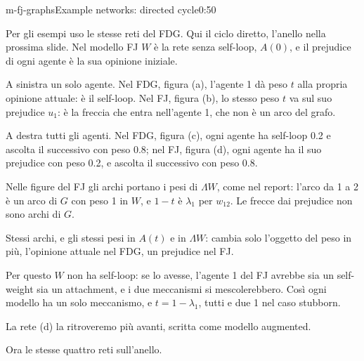 
\begin{slide}{m-fj-graphs}{Example networks: directed cycle}{0:50}
  \begin{discorso}
    \item Per gli esempi uso le stesse reti del FDG. Qui il ciclo diretto, l'anello nella prossima slide. Nel modello FJ $W$ è la rete senza self-loop, $A(0)$, e il prejudice di ogni agente è la sua opinione iniziale.
    \item A sinistra un solo agente. Nel FDG, figura (a), l'agente 1 dà peso $t$ alla propria opinione attuale: è il self-loop. Nel FJ, figura (b), lo stesso peso $t$ va sul suo prejudice $u_1$: è la freccia che entra nell'agente 1, che non è un arco del grafo.
    \item A destra tutti gli agenti. Nel FDG, figura (c), ogni agente ha self-loop 0.2 e ascolta il successivo con peso 0.8; nel FJ, figura (d), ogni agente ha il suo prejudice con peso 0.2, e ascolta il successivo con peso 0.8.
    \item Nelle figure del FJ gli archi portano i pesi di $\Lambda W$, come nel report: l'arco da 1 a 2 è un arco di $G$ con peso 1 in $W$, e $1-t$ è $\lambda_1$ per $w_{12}$. Le frecce dai prejudice non sono archi di $G$.
    \item Stessi archi, e gli stessi pesi in $A(t)$ e in $\Lambda W$: cambia solo l'oggetto del peso in più, l'opinione attuale nel FDG, un prejudice nel FJ.
    \item Per questo $W$ non ha self-loop: se lo avesse, l'agente 1 del FJ avrebbe sia un self-weight sia un attachment, e i due meccanismi si mescolerebbero. Così ogni modello ha un solo meccanismo, e $t=1-\lambda_1$, tutti e due 1 nel caso stubborn.
    \item La rete (d) la ritroveremo più avanti, scritta come modello augmented.
    \item Ora le stesse quattro reti sull'anello.
  \end{discorso}
\end{slide}

